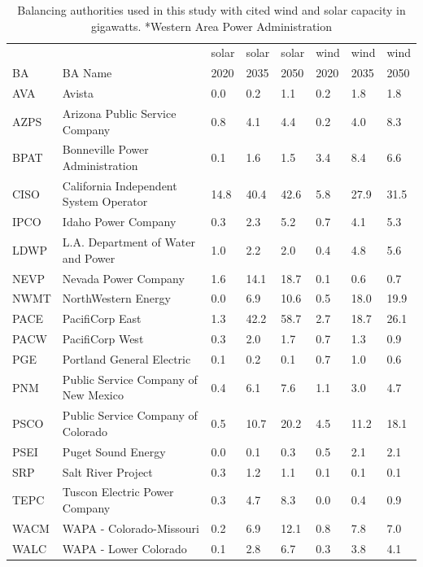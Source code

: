 \documentclass{agujournal2019}
\begin{document}
\clearpage
{}

\begin{table}[ht]
\begin{tabular}{llllllll}
     &                                        & solar & solar & solar & wind & wind & wind \\
BA   & BA Name                                & 2020  & 2035  & 2050  & 2020 & 2035 & 2050 \\
\hline
AVA  & Avista                                 &   0.0 & 0.2 & 1.1 & 0.2 & 1.8 & 1.8 \\ 
AZPS & Arizona Public Service Company         &   0.8 & 4.1 & 4.4 & 0.2 & 4.0 & 8.3 \\ 
BPAT & Bonneville Power Administration        &   0.1 & 1.6 & 1.5 & 3.4 & 8.4 & 6.6 \\ 
CISO & California Independent System Operator &   14.8 & 40.4 & 42.6 & 5.8 & 27.9 & 31.5 \\ 
IPCO & Idaho Power Company                    &   0.3 & 2.3 & 5.2 & 0.7 & 4.1 & 5.3 \\ 
LDWP & L.A. Department of Water and Power     &   1.0 & 2.2 & 2.0 & 0.4 & 4.8 & 5.6 \\ 
NEVP & Nevada Power Company                   &   1.6 & 14.1 & 18.7 & 0.1 & 0.6 & 0.7 \\ 
NWMT & NorthWestern Energy                    &   0.0 & 6.9 & 10.6 & 0.5 & 18.0 & 19.9 \\ 
PACE & PacifiCorp East                        &   1.3 & 42.2 & 58.7 & 2.7 & 18.7 & 26.1 \\ 
PACW & PacifiCorp West                        &   0.3 & 2.0 & 1.7 & 0.7 & 1.3 & 0.9 \\ 
PGE  & Portland General Electric              &   0.1 & 0.2 & 0.1 & 0.7 & 1.0 & 0.6 \\ 
PNM  & Public Service Company of New Mexico   &   0.4 & 6.1 & 7.6 & 1.1 & 3.0 & 4.7 \\ 
PSCO & Public Service Company of Colorado     &   0.5 & 10.7 & 20.2 & 4.5 & 11.2 & 18.1 \\ 
PSEI & Puget Sound Energy                     &   0.0 & 0.1 & 0.3 & 0.5 & 2.1 & 2.1 \\ 
SRP  & Salt River Project                     &   0.3 & 1.2 & 1.1 & 0.1 & 0.1 & 0.1 \\ 
TEPC & Tuscon Electric Power Company          &   0.3 & 4.7 & 8.3 & 0.0 & 0.4 & 0.9 \\ 
WACM & WAPA - Colorado-Missouri               &   0.2 & 6.9 & 12.1 & 0.8 & 7.8 & 7.0 \\ 
WALC & WAPA - Lower Colorado                  &   0.1 & 2.8 & 6.7 & 0.3 & 3.8 & 4.1 \\ 
\hline
\end{tabular}
\caption{Balancing authorities used in this study with cited wind and solar capacity in gigawatts. *Western Area Power Administration}
\label{tab:bas-bau}
\end{table}
\end{document}
